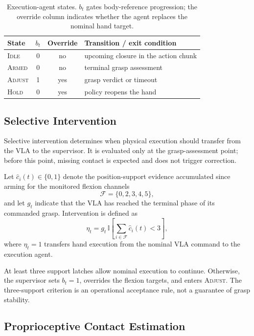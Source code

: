 \documentclass[letterpaper,10pt,conference]{ieeeconf}
\newcommand{\state}[1]{\textsc{#1}}
\begin{document}
\begin{table}[!t]
\caption{Execution-agent states. $b_t$ gates body-reference progression; the
override column indicates whether the agent replaces the nominal hand target.}
\label{tab:states}
\centering\small
\setlength{\tabcolsep}{4pt}
\begin{tabularx}{\columnwidth}{lccY}
\toprule
State & $b_t$ & Override & Transition / exit condition\\
\midrule
\state{Idle}
& 0 & no
& upcoming closure in the action chunk\\
\state{Armed}
& 0 & no
& terminal grasp assessment\\
\state{Adjust}
& 1 & yes
& grasp verdict or timeout\\
\state{Hold}
& 0 & yes
& policy reopens the hand\\
\bottomrule
\end{tabularx}
\end{table}

\subsection{Selective Intervention}
\label{sec:intervention}

Selective intervention determines when physical execution should transfer from
the VLA to the supervisor. It is evaluated only at the grasp-assessment point;
before this point, missing contact is expected and does not trigger correction.

Let $\hat{c}_i(t)\in\{0,1\}$ denote the position-support evidence accumulated
since arming for the monitored flexion channels
\[
\mathcal{F}=\{0,2,3,4,5\},
\]
and let $g_t$ indicate that the VLA has reached the terminal phase of its
commanded grasp. Intervention is defined as
\begin{equation}
\eta_t =
g_t\,\mathbb{I}\!\left[
\sum_{i\in\mathcal{F}}\hat{c}_i(t)<3
\right],
\label{eq:intervention}
\end{equation}
where $\eta_t=1$ transfers hand execution from the nominal VLA command to the
execution agent.

At least three support latches allow nominal execution to continue. Otherwise,
the supervisor sets $b_t=1$, overrides the flexion targets, and enters
\state{Adjust}. The three-support criterion is an operational acceptance rule,
not a guarantee of grasp stability.

\subsection{Proprioceptive Contact Estimation}
\label{sec:contact}
\end{document}
